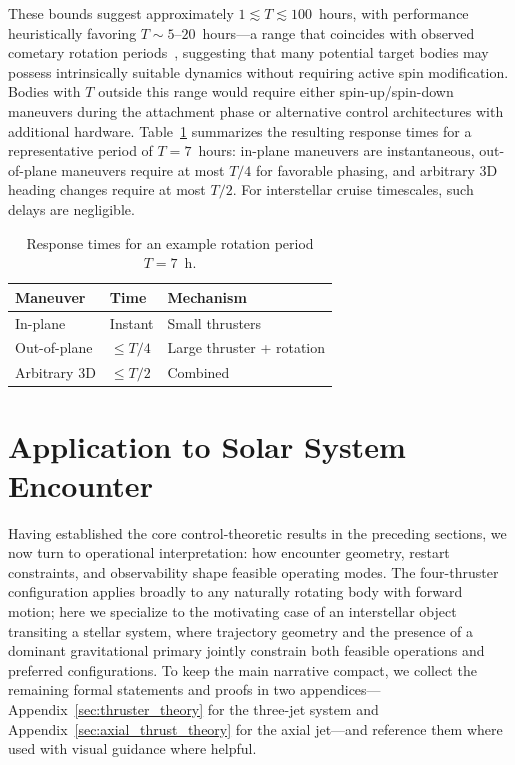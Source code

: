\documentclass{article}
\begin{document}
These bounds suggest approximately $1 \lesssim T \lesssim 100$~hours, with performance heuristically favoring $T \sim 5$--$20$~hours---a range that coincides with observed cometary rotation periods~\cite{Kokotanekova2017Rotation}, suggesting that many potential target bodies may possess intrinsically suitable dynamics without requiring active spin modification. Bodies with $T$ outside this range would require either spin-up/spin-down maneuvers during the attachment phase or alternative control architectures with additional hardware. Table~\ref{tab:response} summarizes the resulting response times for a representative period of $T = 7$~hours: in-plane maneuvers are instantaneous, out-of-plane maneuvers require at most $T/4$ for favorable phasing, and arbitrary 3D heading changes require at most $T/2$. For interstellar cruise timescales, such delays are negligible.

\begin{table}[h!]
\caption{Response times for an example rotation period $T = 7$~h.}
\label{tab:response}
\begin{center}
\small
\begin{tabular}{@{}lll@{}}
\toprule
Maneuver & Time & Mechanism \\
\midrule
In-plane & Instant & Small thrusters \\
Out-of-plane & $\leq T/4$ & Large thruster + rotation \\
Arbitrary 3D & $\leq T/2$ & Combined \\
\bottomrule
\end{tabular}
\end{center}
\end{table}



\section{Application to Solar System Encounter}
\label{sec:application}

Having established the core control-theoretic results in the preceding sections, we now turn to operational interpretation: how encounter geometry, restart constraints, and observability shape feasible operating modes. The four-thruster configuration applies broadly to any naturally rotating body with forward motion; here we specialize to the motivating case of an interstellar object transiting a stellar system, where trajectory geometry and the presence of a dominant gravitational primary jointly constrain both feasible operations and preferred configurations. To keep the main narrative compact, we collect the remaining formal statements and proofs in two appendices---Appendix~\ref{sec:thruster_theory} for the three-jet system and Appendix~\ref{sec:axial_thrust_theory} for the axial jet---and reference them where used with visual guidance where helpful. 
\end{document}
